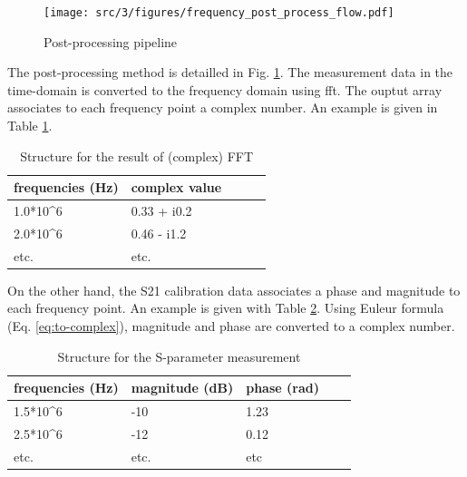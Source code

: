 \begin{figure}[!h]
  \centering
  \texttt{[image: src/3/figures/frequency\_post\_process\_flow.pdf]}
  \caption{Post-processing pipeline}
  \label{fig:postprocess-nfs-pipeline}
\end{figure}

The post-processing method is detailled in Fig. \ref{fig:postprocess-nfs-pipeline}.
The measurement data in the time-domain is converted to the frequency domain using \gls{fft}.
The ouptut array associates to each frequency point a complex number.
An example is given in Table \ref{tab:complex-fft}.

\begin{table}[!h]
  \centering
  \begin{tabular}{@{}lllll@{}}
  \toprule
  frequencies (Hz)        & complex value                \\ \midrule
  1.0*10^6                & 0.33 + i0.2                  \\
  2.0*10^6                & 0.46 - i1.2                  \\
  etc.                    & etc.                         \\ \bottomrule
  \end{tabular}
  \caption{Structure for the result of (complex) FFT}
  \label{tab:complex-fft}
\end{table}

On the other hand, the S21 calibration data associates a phase and magnitude to each frequency point.
An example is given with Table \ref{tab:sparams}.
Using Euleur formula (Eq. \ref{eq:to-complex}), magnitude and phase are converted to a complex number.

\begin{table}[!h]
  \centering
  \begin{tabular}{@{}lllll@{}}
  \toprule
  frequencies (Hz)          & magnitude (dB)         & phase (rad)     \\ \midrule
  1.5*10^6                  & -10                    & 1.23            \\
  2.5*10^6                  & -12                    & 0.12            \\
  etc.                      & etc.                   & etc             \\ \bottomrule
  \end{tabular}
  \caption{Structure for the S-parameter measurement}
  \label{tab:sparams}
\end{table}

